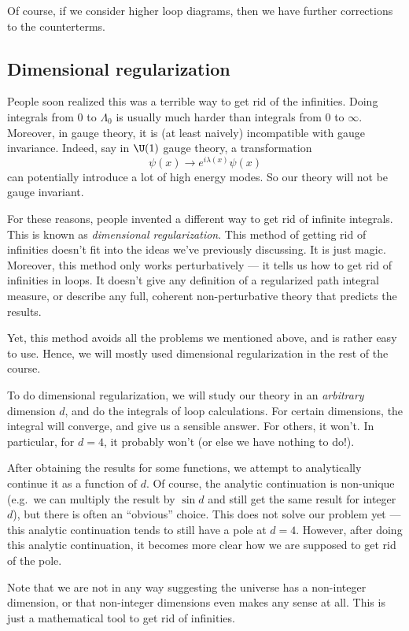 \documentclass[a4paper]{article}
\begin{document}
Of course, if we consider higher loop diagrams, then we have further corrections to the counterterms.
\subsection{Dimensional regularization}
People soon realized this was a terrible way to get rid of the infinities. Doing integrals from $0$ to $\Lambda_0$ is usually much harder than integrals from $0$ to $\infty$. Moreover, in gauge theory, it is (at least naively) incompatible with gauge invariance. Indeed, say in $\U(1)$ gauge theory, a transformation
\[
  \psi(x) \to e^{i\lambda(x)} \psi(x)
\]
can potentially introduce a lot of high energy modes. So our theory will not be gauge invariant.

For these reasons, people invented a different way to get rid of infinite integrals. This is known as \emph{dimensional regularization}. This method of getting rid of infinities doesn't fit into the ideas we've previously discussing. It is just magic. Moreover, this method only works perturbatively --- it tells us how to get rid of infinities in loops. It doesn't give any definition of a regularized path integral measure, or describe any full, coherent non-perturbative theory that predicts the results.

Yet, this method avoids all the problems we mentioned above, and is rather easy to use. Hence, we will mostly used dimensional regularization in the rest of the course.

To do dimensional regularization, we will study our theory in an \emph{arbitrary} dimension $d$, and do the integrals of loop calculations. For certain dimensions, the integral will converge, and give us a sensible answer. For others, it won't. In particular, for $d = 4$, it probably won't (or else we have nothing to do!).

After obtaining the results for some functions, we attempt to analytically continue it as a function of $d$. Of course, the analytic continuation is non-unique (e.g.\ we can multiply the result by $\sin d$ and still get the same result for integer $d$), but there is often an ``obvious'' choice. This does not solve our problem yet --- this analytic continuation tends to still have a pole at $d = 4$. However, after doing this analytic continuation, it becomes more clear how we are supposed to get rid of the pole.

Note that we are not in any way suggesting the universe has a non-integer dimension, or that non-integer dimensions even makes any sense at all. This is just a mathematical tool to get rid of infinities.
\end{document}
